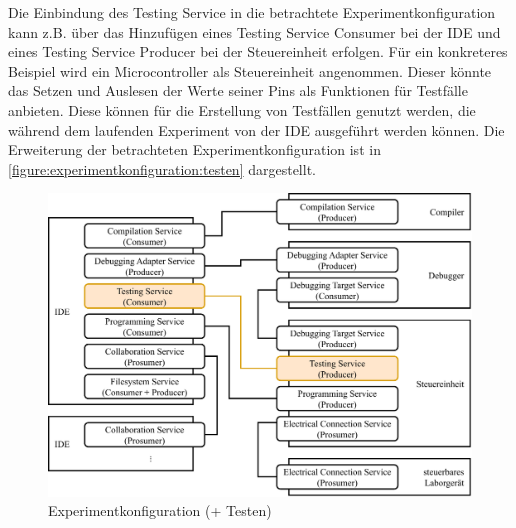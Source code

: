 Die Einbindung des Testing Service in die betrachtete Experimentkonfiguration kann z.B. über das Hinzufügen eines Testing Service Consumer bei der IDE und eines Testing Service Producer bei der Steuereinheit erfolgen. Für ein konkreteres Beispiel wird ein Microcontroller als Steuereinheit angenommen. Dieser könnte das Setzen und Auslesen der Werte seiner Pins als Funktionen für Testfälle anbieten. Diese können für die Erstellung von Testfällen genutzt werden, die während dem laufenden Experiment von der IDE ausgeführt werden können. Die Erweiterung der betrachteten Experimentkonfiguration ist in \autoref{figure:experimentkonfiguration:testen} dargestellt.

\begin{figure}[tbp]
    \centering
    \includegraphics[width=\textwidth]{diagrams/experimentkonfigurationen/Experimentkonfiguration-05.drawio.pdf}
    \caption{Experimentkonfiguration (+ Testen)}
    \label{figure:experimentkonfiguration:testen}
\end{figure}